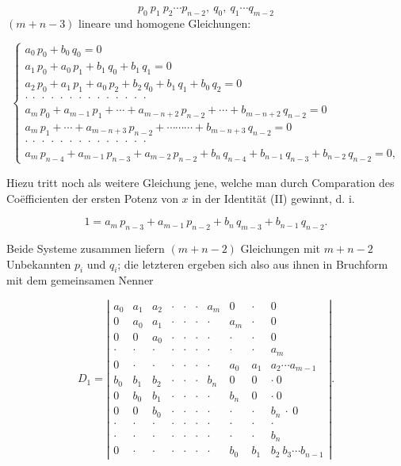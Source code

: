\documentclass[11pt]{article}
\providecommand{\weberpage}[1]{}
\providecommand{\weq}[2]{\begin{equation}\tag{#1}#2\end{equation}}
\begin{document}
\[
p_0\ p_1\ p_2 \cdots p_{n-2},\ q_0,\ q_1 \cdots q_{m-2}
\]
$(m+n-3)$ lineare und homogene Gleichungen:

\weq{I}{
\left\{
\begin{gathered}
a_0\,p_0 + b_0\,q_0 = 0\\
a_1\,p_0 + a_0\,p_1 + b_1\,q_0 + b_1\,q_1 = 0\\
a_2\,p_0 + a_1\,p_1 + a_0\,p_2 + b_2\,q_0 + b_1\,q_1 + b_0\,q_2 = 0\\
\cdot\ \cdot\ \cdot\ \cdot\ \cdot\ \cdot\ \cdot\ \cdot\ \cdot\ \cdot\ \cdot\ \cdot\ \cdot\ \cdot\\
a_m\,p_0 + a_{m-1}\,p_1 + \cdots + a_{m-n+2}\,p_{n-2} + \cdots + b_{m-n+2}\,q_{n-2} = 0\\
a_m\,p_1 + \cdots + a_{m-n+3}\,p_{n-2} + \cdots\cdots\cdots + b_{m-n+3}\,q_{n-2} = 0\\
\cdot\ \cdot\ \cdot\ \cdot\ \cdot\ \cdot\ \cdot\ \cdot\ \cdot\ \cdot\ \cdot\ \cdot\ \cdot\ \cdot\\
a_m\,p_{n-4} + a_{m-1}\,p_{n-3} + a_{m-2}\,p_{n-2} + b_n\,q_{n-4} + b_{n-1}\,q_{n-3} + b_{n-2}\,q_{n-2} = 0,
\end{gathered}
\right.
}


\weberpage{140}

Hiezu tritt noch als weitere Gleichung jene, welche man durch Comparation des Co\"efficienten der ersten Potenz von $x$ in der Identität (II) gewinnt, d. i.

\weq{2}{1 = a_m\,p_{n-3} + a_{m-1}\,p_{n-2} + b_n\,q_{m-3} + b_{n-1}\,q_{n-2}.}

Beide Systeme zusammen liefern $(m+n-2)$ Gleichungen mit $m+n-2$ Unbekannten $p_i$ und $q_i$; die letzteren ergeben sich also aus ihnen in Bruchform mit dem gemeinsamen Nenner

\[
D_1 =
\left|
\begin{array}{cccccccccc}
a_0 & a_1 & a_2 & \cdot & \cdot & \cdot & a_m & 0 & \cdot & 0\\
0 & a_0 & a_1 & \cdot & \cdot & \cdot & \cdot & a_m & \cdot & 0\\
0 & 0 & a_0 & \cdot & \cdot & \cdot & \cdot & \cdot & \cdot & 0\\
\cdot & \cdot & \cdot & \cdot & \cdot & \cdot & \cdot & \cdot & \cdot & a_m\\
0 & \cdot & \cdot & \cdot & \cdot & \cdot & \cdot & a_0 & a_1 & a_2 \cdots a_{m-1}\\
b_0 & b_1 & b_2 & \cdot & \cdot & \cdot & b_n & 0 & 0 & \cdot\ 0\\
0 & b_0 & b_1 & \cdot & \cdot & \cdot & \cdot & b_n & 0 & \cdot\ 0\\
0 & 0 & b_0 & \cdot & \cdot & \cdot & \cdot & \cdot & \cdot & b_n\ \cdot\ 0\\
\cdot & \cdot & \cdot & \cdot & \cdot & \cdot & \cdot & \cdot & \cdot & \cdot\\
\cdot & \cdot & \cdot & \cdot & \cdot & \cdot & \cdot & \cdot & \cdot & b_n\\
0 & \cdot & \cdot & \cdot & \cdot & \cdot & \cdot & b_0 & b_1 & b_2\ b_3 \cdots b_{n-1}
\end{array}
\right|.
\]
\end{document}
